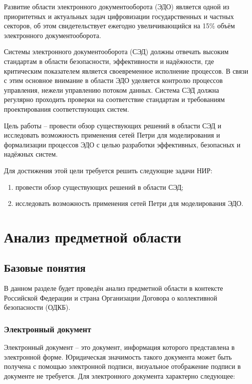 
\pagebreak


Развитие области электронного документооборота (ЭДО) является одной из приоритетных и актуальных задач цифровизации государственных и частных секторов, об этом свидетельствует ежегодно увеличивающийся на 15\% объём электронного документооборота\cite{roseu}. 

Системы электронного документооборота (СЭД) должны отвечать высоким стандартам в области безопасности, эффективности и надёжности, где критическим показателем является своевременное исполнение процессов\cite{software-standards}. В связи с этим основное внимание в области ЭДО уделяется контролю процессов управления, нежели управлению потоком данных\cite{data-flow}. Система СЭД должна регулярно проходить проверки на соответствие стандартам и требованиям проектирования соответствующих систем\cite{gost}.

Цель работы -- провести обзор существующих решений в области СЭД и исследовать возможность применения сетей Петри для моделирования и формализации процессов ЭДО с целью разработки эффективных, безопасных и надёжных систем.

Для достижения этой цели требуется решить следующие задачи НИР:
\begin{enumerate}
	\item провести обзор существующих решений в области СЭД;
	\item исследовать возможность применения сетей Петри для моделирования ЭДО.
\end{enumerate}

\clearpage

\section{Анализ предметной области}
\subsection{Базовые понятия}

В данном разделе будет проведён анализ предметной области в контексте Российской Федерации и страна Организации Договора о коллективной безопасности (ОДКБ)\cite{odkb}.

\subsubsection{Электронный документ}

Электронный документ -- это документ, информация которого представлена в электронной форме. Юридическая значимость такого документа может быть получена с помощью электронной подписи, визуальное отображение подписи в документе не требуется\cite{fz-ds}. Для электронного документа характерно следующее:


